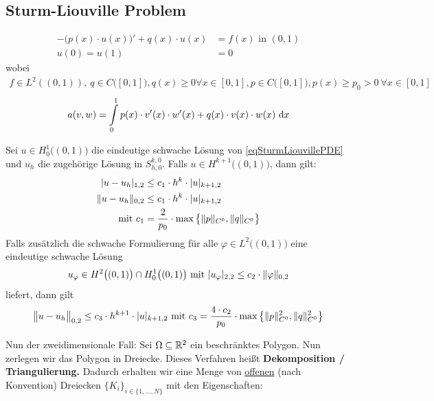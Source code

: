 \subsection*{Sturm-Liouville Problem}
\begin{align}\label{eqSturmLiouvillePDE}\tag{SturmLiouville}
-\big(p(x)\cdot u(x)\big)'+q(x)\cdot u(x) &= f(x) \text{ in } (0,1)\\\nonumber
u(0)=u(1)&=0
\end{align}
wobei
\begin{align*}
f\in L^2((0,1)),~q\in C\big([0,1]\big), q(x)\geq0\forall x\in[0,1], p\in C\big([0,1]\big), p(x)\geq p_0>0~\forall x\in [0,1]
\end{align*}
\begin{align*}
a(v,w)=\int\limits_0^1 p(x)\cdot v'(x)\cdot w'(x)+q(x)\cdot v(x)\cdot w(x)\d x
\end{align*}

\begin{theorem}\label{theorem4.4}
Sei $u\in H^1_0\big((0,1)\big)$ die eindeutige schwache Lösung von \eqref{eqSturmLiouvillePDE} und $u_h$ die zugehörige Lösung in $S_{h,0}^{k,0}$.
Falls $u\in H^{k+1}\big((0,1)\big)$, dann gilt:
\begin{align*}
|u-u_h|_{1,2}&\leq c_1\cdot h^k\cdot |u|_{k+1,2}\\
\Vert u-u_h\Vert_{0,2}&\leq c_1\cdot h^k\cdot |u|_{k+1,2}\\
\mit c_1&=\frac{2}{p_0}\cdot\max\limits\big\lbrace \Vert p\Vert_{C^0},\Vert q\Vert_{C^0}\big\rbrace
\end{align*}
Falls zusätzlich die schwache Formulierung für alle $\varphi\in L^2\big((0,1)\big)$ eine eindeutige schwache Lösung 
\begin{align*}
u_\varphi\in H^2\big((0,1)\big)\cap H^1_0\big((0,1)\big)\mit |u_\varphi|_{2,2}\leq c_2\cdot\Vert \varphi\Vert_{0,2}
\end{align*}
liefert, dann gilt
\begin{align*}
\big\Vert u-u_h\big\Vert_{0,2}\leq c_3\cdot h^{k+1}\cdot |u|_{k+1,2}
\mit c_3=\frac{4\cdot c_2}{p_0}\cdot\max\limits\left\lbrace\Vert p\Vert^2_{C^0},\Vert q\Vert^2_{C^0}\right\rbrace
\end{align*}
\end{theorem}

Nun der zweidimensionale Fall: Sei $\Omega\subseteq\R^2$ ein beschränktes Polygon. Nun zerlegen wir das Polygon in Dreiecke. Dieses Verfahren heißt \textbf{Dekomposition / Triangulierung.} Dadurch erhalten wir eine Menge von \underline{offenen} (nach Konvention) Dreiecken $\lbrace K_i\rbrace_{i\in\lbrace1,\ldots,N\rbrace}$ mit den Eigenschaften:

